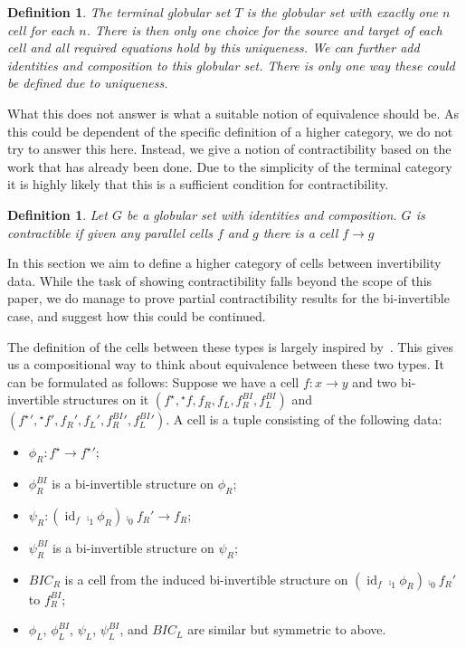 \documentclass[draft]{article}
\newtheorem{definition}[theorem]{Definition} \theoremstyle{remark}
\DeclareMathOperator{\id}{id}
\newcommand{\linv}[1]{{}^\star\!#1} \newcommand{\rinv}[1]{#1^\star}
\begin{document}
\begin{definition}
  The terminal globular set \(T\) is the globular set with exactly one
  \(n\) cell for each \(n\). There is then only one choice for the
  source and target of each cell and all required equations hold by
  this uniqueness. We can further add identities and composition to
  this globular set. There is only one way these could be defined due
  to uniqueness.
\end{definition}

What this does not answer is what a suitable notion of equivalence
should be. As this could be dependent of the specific definition of a
higher category, we do not try to answer this here. Instead, we give a
notion of contractibility based on the work that has already been
done. Due to the simplicity of the terminal category it is highly
likely that this is a sufficient condition for contractibility.

\begin{definition}
  Let \(G\) be a globular set with identities and composition. \(G\)
  is \emph{contractible} if given any parallel cells \(f\) and \(g\)
  there is a cell \(f \to g\)
\end{definition}

In this section we aim to define a higher category of cells between
invertibility data. While the task of showing contractibility falls
beyond the scope of this paper, we do manage to prove partial
contractibility results for the bi-invertible case, and suggest how
this could be continued.

The definition of the cells between these types is largely inspired
by~\cite[Lemma 4.2.5]{hottbook}. This gives us a compositional way to
think about equivalence between these two types. It can be formulated
as follows: Suppose we have a cell \(f : x \to y\) and two
bi-invertible structures on it \((\rinv f, \linv f, f_R, f_L,
f_R^{BI}, f_L^{BI})\) and \((\rinv f{}' , \linv f{}', f_R', f_L',
f_R^{BI}{}', f_L^{BI}{}')\). A cell is a tuple
consisting of the following data:
\begin{itemize}
\item \(\phi_R : \rinv f \to \rinv f{}'\);
\item \(\phi_R^{BI}\) is a bi-invertible structure on \(\phi_R\);
\item \(\psi_R : (\id_f \comp_1 \phi_R) \comp_0 f_R' \to f_R\);
\item \(\psi_R^{BI}\) is a bi-invertible structure on \(\psi_R\);
\item \(BIC_R\) is a cell from the induced bi-invertible structure on
  \((\id_f \comp_1 \phi_R) \comp_0 f_R'\) to \(f_R^{BI}\);
\item \(\phi_L\), \(\phi_L^{BI}\), \(\psi_L\), \(\psi_L^{BI}\), and
  \(BIC_L\) are similar but symmetric to above.
\end{itemize}
\end{document}
